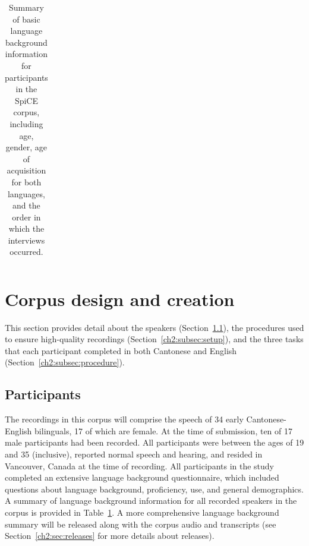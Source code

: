 \begin{table}[!htbp]
\begin{center}
\begin{tabular}{ccccccc}
\bottomrule

\end{tabular}
\caption{Summary of basic language background information for participants in the SpiCE corpus, including age, gender, age of acquisition for both languages, and the order in which the interviews occurred.}
\label{ch2:tab:participants}
\end{center}
\end{table}

\section{Corpus design and creation}\label{ch2:sec:design}

This section provides detail about the speakers (Section~\ref{ch2:subsec:participants}), the procedures used to ensure high-quality recordings (Section~\ref{ch2:subsec:setup}), and the three tasks that each participant completed in both Cantonese and English (Section~\ref{ch2:subsec:procedure}).

\subsection{Participants}\label{ch2:subsec:participants} 
The recordings in this corpus will comprise the speech of 34 early Cantonese-English bilinguals, 17 of which are female. At the time of submission, ten of 17 male participants had been recorded. All participants were between the ages of 19 and 35 (inclusive), reported normal speech and hearing, and resided in Vancouver, Canada at the time of recording. All participants in the study completed an extensive language background questionnaire, which included questions about language background, proficiency, use, and general demographics. A summary of language background information for all recorded speakers in the corpus is provided in Table~\ref{ch2:tab:participants}. A more comprehensive language background summary will be released along with the corpus audio and transcripts (see Section~\ref{ch2:sec:releases} for more details about releases).

